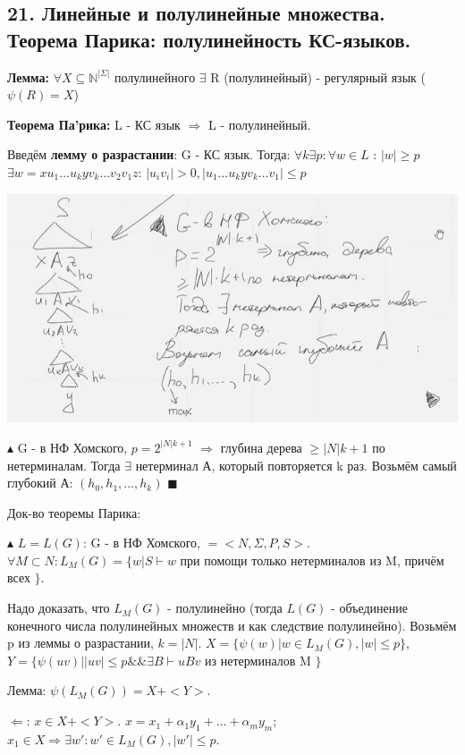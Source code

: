 \subsection{21. Линейные и полулинейные множества. Теорема Парика: полулинейность КС-языков.}

\textbf{Лемма:} $\forall X \subseteq \mathbb{N}^{|\Sigma|}$ полулинейного $\exists$ R (полулинейный) - регулярный язык ($\psi(R) = X$)

\textbf{Теорема Па'рика:} L - КС язык $\Rightarrow$ L - полулинейный.

Введём \textbf{лемму о разрастании}: G - КС язык. Тогда: $\forall k \exists p: \forall w \in L$ : $|w| \geqslant p$ $\exists w = xu_1\dots u_kyv_k \dots v_2v_1z$: $|u_iv_i| > 0, |u_1 \dots u_kyv_k \dots v_1| \leqslant p$

\includegraphics[]{images/parikh3.JPG}

$\blacktriangle$ G - в НФ Хомского, $p = 2^{|N|k + 1}$ $\Rightarrow$ глубина дерева $\geqslant |N|k + 1$ по нетерминалам. Тогда $\exists$ нетерминал А, который повторяется k раз. Возьмём самый глубокий А: $(h_0, h_1, \dots, h_k)$
$\blacksquare$

Док-во теоремы Парика:

$\blacktriangle$ $L = L(G)$: G - в НФ Хомского, $= <N, \Sigma, P, S>$. $\forall M \subset N: L_M(G) = \{w|S \vdash w$ при помощи только нетерминалов из M, причём всех $\}$.

Надо доказать, что $L_M(G)$ - полулинейно (тогда $L(G)$ - объединение конечного числа полулинейных множеств и как следствие полулинейно). Возьмём p из леммы о разрастании, $k = |N|$. $X = \{ \psi(w) | w\in L_M(G), |w| \leqslant p\}$, $Y = \{ \psi(uv) | |uv| \leqslant p \&\& \exists B \vdash uBv$ из нетерминалов M $\}$

Лемма: $\psi(L_M(G)) = X + <Y>$.

$\Leftarrow$: $x \in X + <Y>$. $x = x_1 + \alpha_1y_1 + \dots + \alpha_m y_m$; $x_1 \in X \Rightarrow \exists w': w' \in L_M(G), |w'| \leqslant p$. 

